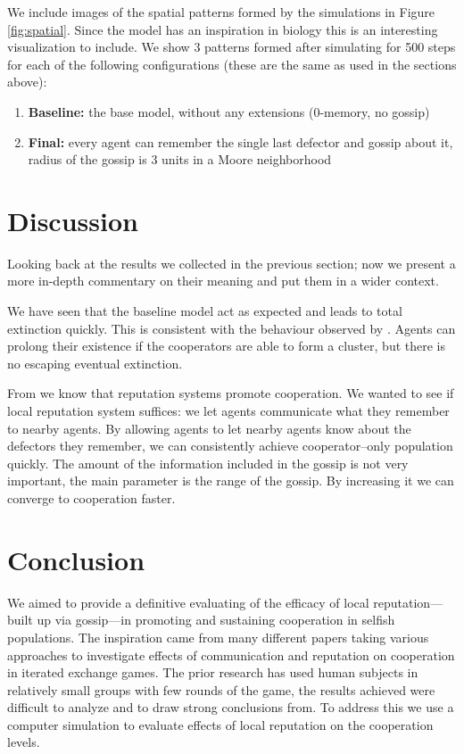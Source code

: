 \documentclass[english]{article}
\begin{document}
We include images of the spatial patterns formed by the simulations in Figure \ref{fig:spatial}.
Since the model has an inspiration in biology this is an interesting visualization to include.
We show 3 patterns formed after simulating for 500 steps for each of the following configurations
(these are the same as used in the sections above):
\begin{enumerate}
  \setlength\itemsep{0em}
  \setlength\parskip{0cm}
  \item
    \textbf{Baseline:} the base model, without any extensions (0-memory, no gossip)
  \item
    \textbf{Final:} every agent can remember the single last defector and gossip about it,
    radius of the gossip is 3 units in a Moore neighborhood
\end{enumerate}



\section{Discussion}
Looking back at the results we collected in the previous section;
now we present a more in-depth commentary on their meaning and
put them in a wider context.

We have seen that the baseline model act as expected and leads to total extinction quickly.
This is consistent with the behaviour observed by \citet{smaldino}.
Agents can prolong their existence if the cooperators are able to form a cluster,
but there is no escaping eventual extinction.

From \citet{simple-reputation, public-private-monitoring} we know that reputation systems promote cooperation.
We wanted to see if local reputation system suffices: we let agents communicate what they remember to nearby agents.
By allowing agents to let nearby agents know about the defectors they remember, we can consistently achieve cooperator--only population quickly.
The amount of the information included in the gossip is not very important, the main parameter is the range of the gossip.
By increasing it we can converge to cooperation faster.



\section{Conclusion}
We aimed to provide a definitive evaluating of the efficacy of local reputation---built up via gossip---in promoting and sustaining cooperation in selfish populations.
The inspiration came from many different papers taking various approaches to investigate effects of communication and reputation on cooperation in iterated exchange games.
The prior research has used human subjects in relatively small groups with few rounds of the game, the results achieved were difficult to analyze and to draw strong conclusions from.
To address this we use a computer simulation to evaluate effects of local reputation on the cooperation levels.
\end{document}
